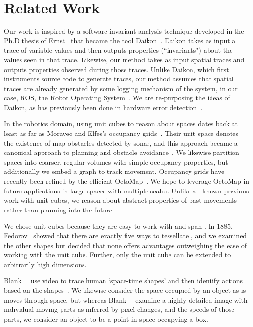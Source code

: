 \section{Related Work}
\label{sec:related}

Our work is inspired by a software invariant analysis technique developed in the Ph.D thesis of Ernst~\cite{ernst2000dynamically} that became the tool Daikon~\cite{ernst2007daikon}.
Daikon takes as input a trace of variable values and then outputs properties (``invariants") about the values seen in that trace.
Likewise, our method takes as input spatial traces and outputs properties observed during those traces.
Unlike Daikon, which first instruments source code to generate traces, our method assumes that spatial traces are already generated by some logging mechanism of the system, in our case, ROS, the Robot Operating System~\cite{quigley2009ros}.
We are re-purposing the ideas of Daikon, as has previously been done in hardware error detection~\cite{sahoo2008using}.

In the robotics domain, using unit cubes to reason about spaces dates back at least as far as Moravec and Elfes's occupancy grids~\cite{moravec1985high}.
Their unit space denotes the existence of map obstacles detected by sonar, and this approach became a canonical approach to planning and obstacle avoidance~\cite{siegwart2011introduction,elfes1989using,borenstein1989real}.
We likewise partition spaces into coarser, regular volumes with simple occupancy properties, but additionally we embed a graph to track movement.
Occupancy grids have recently been refined by the efficient OctoMap~\cite{wurm2010octomap}.
We hope to leverage OctoMap in future applications in large spaces with multiple scales.
Unlike all known previous work with unit cubes, we reason about abstract properties of past movements rather than planning into the future.

We chose unit cubes because they are easy to work with and span \rthree. 
In 1885, Fedorov~\cite{fedorov1885elements} showed that there are exactly five ways to tessellate \rthree, and we examined the other shapes but decided that none offers advantages outweighing the ease of working with the unit cube.
Further, only the unit cube can be extended to arbitrarily high dimensions.

Blank~\etal~ use video to trace human `space-time shapes' and then identify actions based on the shapes~\cite{blank2005actions}.
We likewise consider the space occupied by an object as is moves through space, but whereas Blank~\etal~ examine a highly-detailed image with individual moving parts as inferred by pixel changes, and the speeds of those parts, we consider an object to be a point in space occupying a box.


